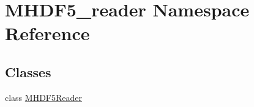 \hypertarget{namespace_m_h_d_f5__reader}{}\section{M\+H\+D\+F5\+\_\+reader Namespace Reference}
\label{namespace_m_h_d_f5__reader}
\subsection*{Classes}
\begin{DoxyCompactItemize}
\item 
class \mbox{\hyperlink{class_m_h_d_f5__reader_1_1_m_h_d_f5_reader}{M\+H\+D\+F5\+Reader}}
\end{DoxyCompactItemize}
